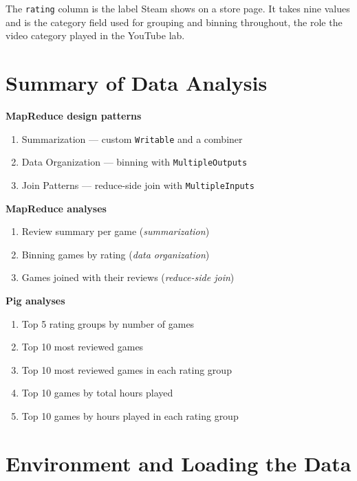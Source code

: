 \documentclass[11pt,a4paper]{article}
\newcommand{\code}[1]{\texttt{#1}}
\begin{document}
The \code{rating} column is the label Steam shows on a store page. It takes nine values and is the
category field used for grouping and binning throughout, the role the video category played in the
YouTube lab.

\section{Summary of Data Analysis}

\begin{minipage}[t]{0.32\linewidth}
\textbf{MapReduce design patterns}
\begin{enumerate}
  \item Summarization — custom \code{Writable} and a combiner
  \item Data Organization — binning with \code{MultipleOutputs}
  \item Join Patterns — reduce-side join with \code{MultipleInputs}
\end{enumerate}
\end{minipage}\hfill
\begin{minipage}[t]{0.32\linewidth}
\textbf{MapReduce analyses}
\begin{enumerate}
  \item Review summary per game (\emph{summarization})
  \item Binning games by rating (\emph{data organization})
  \item Games joined with their reviews (\emph{reduce-side join})
\end{enumerate}
\end{minipage}\hfill
\begin{minipage}[t]{0.32\linewidth}
\textbf{Pig analyses}
\begin{enumerate}
  \item Top 5 rating groups by number of games
  \item Top 10 most reviewed games
  \item Top 10 most reviewed games in each rating group
  \item Top 10 games by total hours played
  \item Top 10 games by hours played in each rating group
\end{enumerate}
\end{minipage}

\section{Environment and Loading the Data}
\end{document}
